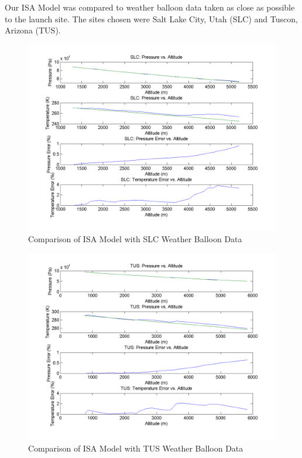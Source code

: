 \documentclass[]{article}
\begin{document}
Our ISA Model was compared to weather balloon data taken as close as
possible to the launch site. The sites chosen were Salt Lake City, Utah
(SLC) and Tuscon, Arizona (TUS).

\begin{figure}[htbp]
\centering
\includegraphics{images/plots/SLC_plot.png}
\caption{Comparison of ISA Model with SLC Weather Balloon Data
\label{atmosphere1_plot_label}}
\end{figure}

\begin{figure}[htbp]
\centering
\includegraphics{images/plots/TUS_plot.png}
\caption{Comparison of ISA Model with TUS Weather Balloon Data
\label{atmosphere2_plot_label}}
\end{figure}
\end{document}
